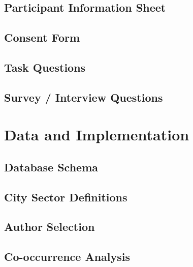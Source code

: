 \documentclass[logo,msc]{infthesis}
\begin{document}
\section{Participant Information Sheet}
% 

\section{Consent Form}
% 

\section{Task Questions}

\section{Survey / Interview Questions}

\chapter{Data and Implementation}

\section{Database Schema}

\section{City Sector Definitions}

\section{Author Selection}

\section{Co-occurrence Analysis}
\end{document}
